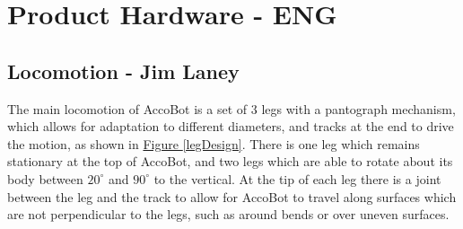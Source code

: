 \documentclass[11pt]{article}		%
\newcommand{\figref}[1]{\hyperref[#1]{Figure \ref*{#1}}}    %
\begin{document}
	\section{Product Hardware - ENG}
	
		\subsection[Locomotion]{Locomotion - Jim Laney} \label{Lomcotion}
			The main locomotion of AccoBot is a set of 3 legs with a pantograph mechanism, which allows for adaptation to different diameters, and tracks at the end to drive the motion, as shown in \figref{legDesign}.
			There is one leg which remains stationary at the top of AccoBot, and two legs which are able to rotate about its body between $20^\circ$ and $90^\circ$ to the vertical.
			At the tip of each leg there is a joint between the leg and the track to allow for AccoBot to travel along surfaces which are not perpendicular to the legs, such as around bends or over uneven surfaces.
			
\end{document}
